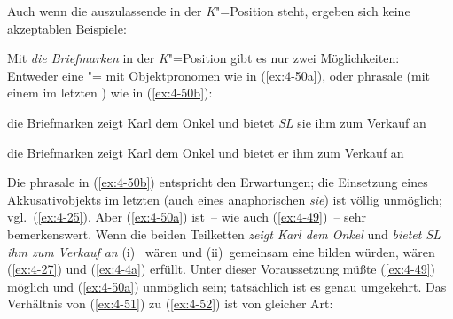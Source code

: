 \documentclass[output=paper]{langsci/langscibook}
\begin{document}
Auch wenn die auszulassende  in der \textit{K}{}"=Position steht, ergeben sich keine akzeptablen Beispiele:


\begin{exe}
\end{exe}
Mit \textit{die Briefmarken} in der \textit{K}{}"=Position gibt es nur zwei Möglichkeiten: Entweder eine "= mit Objektpronomen wie in (\ref{ex:4-50a}), oder phrasale  (mit einem  im letzten ) wie in (\ref{ex:4-50b}):

\begin{exe}
\ex
\label{ex:4-50}
\begin{xlist}
\ex%
\label{ex:4-50a}
die Briefmarken zeigt Karl dem Onkel und bietet \textit{SL} sie ihm zum Verkauf an

\ex%
\label{ex:4-50b}
die Briefmarken zeigt Karl dem Onkel und bietet er ihm zum Verkauf an
\end{xlist}
\end{exe}
\addlines[-1]
Die phrasale  in (\ref{ex:4-50b}) entspricht den Erwartungen; die Einsetzung eines Akkusativobjekts im letzten  (auch eines anaphorischen \textit{sie}) ist völlig unmöglich; vgl.\ (\ref{ex:4-25}). Aber (\ref{ex:4-50a}) ist~-- wie auch (\ref{ex:4-49})~-- sehr bemerkenswert. Wenn die beiden Teilketten \textit{zeigt Karl dem Onkel} und \textit{bietet \textit{SL} ihm zum Verkauf an} (i)~ wären und (ii)~gemeinsam eine  bilden würden, wären (\ref{ex:4-27}) und (\ref{ex:4-4a}) erfüllt. Unter dieser Voraussetzung müßte (\ref{ex:4-49}) möglich und (\ref{ex:4-50a}) unmöglich sein; tatsächlich ist es genau umgekehrt. Das Verhältnis von (\ref{ex:4-51}) zu (\ref{ex:4-52}) ist von gleicher Art:
\end{document}

